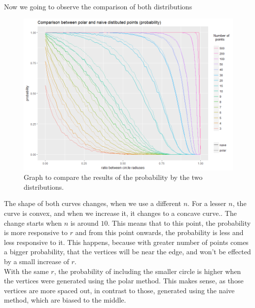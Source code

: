\documentclass[12pt,a4paper]{article}
\begin{document}
Now we going to observe the comparison of both distributions
\begin{figure}[H]
\centering
\includegraphics[scale=0.63]{../graphs/graphs/probability_comparison_new.png}
\caption{Graph to compare the results of the probability by the two distributions.}
\label{f:comparison_probability}
\end{figure}

The shape of both curves changes, when we use a different $n$. For a lesser $n$, the curve is convex, and when we increase it, it changes to a concave curve.. The change starts when $n$ is around $10$. This means that to this point, the probability is more responsive to $r$ and from this point onwards, the probability is less and less responsive to it. This happens, because with greater number of points comes a bigger probability, that the vertices will be near the edge, and won't be effected by a small increase of $r$.\\

With the same $r$, the probability of including the smaller circle is higher when the vertices were generated using the polar method. This makes sense, as those vertices are more spaced out, in contrast to those, generated using the naive method, which are biased to the middle.  \\
 
\end{document}
